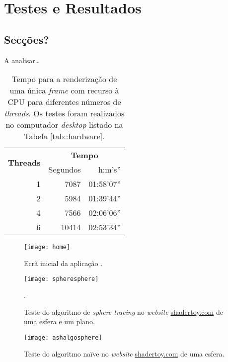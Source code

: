 \chapter{Testes e Resultados}
\label{ch::testes}



\section{Secções?}
A analisar\ldots


\begin{table}[!htbp]
	\centering
	\caption[Tempos de renderização em \acs{CPU}]{Tempo para a renderização de uma única \textit{frame} com recurso à \acs{CPU} para diferentes números de \textit{threads}. Os testes foram realizados no computador \textit{desktop} listado na Tabela \ref{tab::hardware}.}
	\label{tab::render_cpu}
	\begin{tabular}{r r r}
		\toprule
		\multirow{2}{*}{\textbf{Threads}} & \multicolumn{2}{c}{\textbf{Tempo}} \\
		\cline{2-3}
		 & Segundos & h:m's'' \\
		\midrule
		1 &  7087 & 01:58'07'' \\
		2 &  5984 & 01:39'44'' \\
		4 &  7566 & 02:06'06'' \\
		6 & 10414 & 02:53'34'' \\
		\bottomrule
	\end{tabular}
\end{table}


\begin{figure}[!htbp]
	\centering
	\texttt{[image: home]}
	\caption[Ecrã inicial da aplicação]{Ecrã inicial da aplicação \theapp.}
	\label{fig::home}
\end{figure}

\begin{figure}[!htbp]
	\centering
	\texttt{[image: spheresphere]}
	\caption[Teste do algoritmo de \textit{sphere tracing}]{Teste do algoritmo de \textit{sphere tracing} no \textit{website} \url{shadertoy.com} de uma esfera e um plano.}.
	\label{fig::spheresphere}
\end{figure}

\begin{figure}[!htbp]
	\centering
	\texttt{[image: ashalgosphere]}
	\caption[Teste do algoritmo naïve]{Teste do algoritmo naïve no \textit{website} \url{shadertoy.com} de uma esfera.}
	\label{fig::ashalgosphere}
\end{figure}

